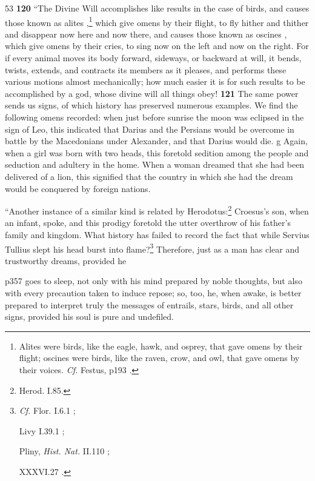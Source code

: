 53
\textbf{120} ``The Divine Will accomplishes like results in the case of birds, and causes those known as alites ,\texthebrew{}\footnote{Alites were birds, like the eagle, hawk, and osprey, that gave omens by their flight; oscines were birds, like the raven, crow, and owl, that gave omens by their voices. \emph{Cf.} Festus, p193 .

} which give omens by their flight, to fly hither and thither and disappear now here and now there, and causes those known as oscines , which give omens by their cries, to sing now on the left and now on the right. For if every animal moves its body forward, sideways, or backward at will, it bends, twists, extends, and contracts its members as it pleases, and performs these various motions almost mechanically; how much easier it is for such results to be accomplished by a god, whose divine will all things obey! \textbf{121} The same power sends us signs, of which history has preserved numerous examples. We find the following omens recorded: when just before sunrise the moon was eclipsed in the sign of Leo, this indicated that Darius and the Persians would be overcome in battle by the Macedonians under Alexander, and that Darius would die.\texthebrew{} g Again, when a girl was born with two heads, this foretold sedition among the people and seduction and adultery in the home. When a woman dreamed that she had been delivered of a lion, this signified that the country in which she had the dream would be conquered by foreign nations.

``Another instance of a similar kind is related by Herodotus:\texthebrew{}\footnote{Herod. I.85.

} Croesus's son, when an infant, spoke, and this prodigy foretold the utter overthrow of his father's family and kingdom. What history has failed to record the fact that while Servius Tullius slept his head burst into flame?\texthebrew{}\footnote{\emph{Cf.} Flor. I.6.1 ;

Livy I.39.1 ;

Pliny, \emph{Hist. Nat.} II.110 ;

XXXVI.27 .

} Therefore, just as a man has clear and trustworthy dreams, provided he

p357 goes to sleep, not only with his mind prepared by noble thoughts, but also with every precaution taken to induce repose; so, too, he, when awake, is better prepared to interpret truly the messages of entrails, stars, birds, and all other signs, provided his soul is pure and undefiled.

